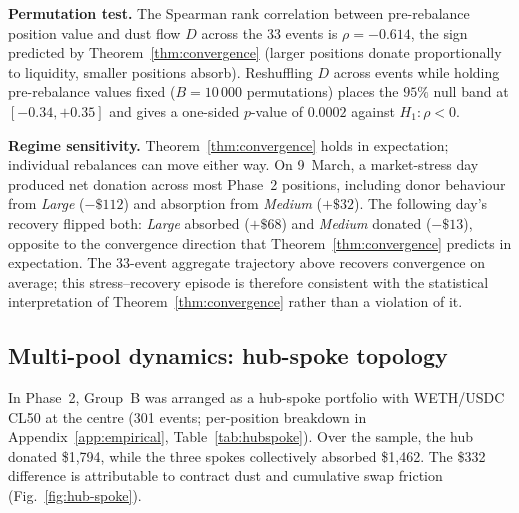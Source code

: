 \documentclass[11pt,a4paper]{article}
\theoremstyle{plain}
\begin{document}
\textbf{Permutation test.} The Spearman rank correlation between pre-rebalance position value and dust flow $D$ across the 33 events is $\rho = -0.614$, the sign predicted by Theorem~\ref{thm:convergence} (larger positions donate proportionally to liquidity, smaller positions absorb). Reshuffling $D$ across events while holding pre-rebalance values fixed ($B = 10\,000$ permutations) places the $95\%$ null band at $[-0.34, +0.35]$ and gives a one-sided $p$-value of $0.0002$ against $H_1: \rho < 0$.

\textbf{Regime sensitivity.} Theorem~\ref{thm:convergence} holds in expectation; individual rebalances can move either way. On 9~March, a market-stress day produced net donation across most Phase~2 positions, including donor behaviour from \textit{Large} ($-\$112$) and absorption from \textit{Medium} ($+\$32$). The following day's recovery flipped both: \textit{Large} absorbed ($+\$68$) and \textit{Medium} donated ($-\$13$), opposite to the convergence direction that Theorem~\ref{thm:convergence} predicts in expectation. The 33-event aggregate trajectory above recovers convergence on average; this stress--recovery episode is therefore consistent with the statistical interpretation of Theorem~\ref{thm:convergence} rather than a violation of it.

\subsection{Multi-pool dynamics: hub-spoke topology}\label{sec:hub-spoke}

In Phase~2, Group~B was arranged as a hub-spoke portfolio with WETH/USDC CL50 at the centre (301 events; per-position breakdown in Appendix~\ref{app:empirical}, Table~\ref{tab:hubspoke}). Over the sample, the hub donated \$1{,}794, while the three spokes collectively absorbed \$1{,}462. The \$332 difference is attributable to contract dust and cumulative swap friction (Fig.~\ref{fig:hub-spoke}).
\end{document}
